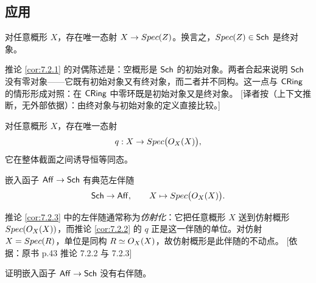 \subsection{应用}\label{sec:7.2}

\begin{corollary}\label{cor:7.2.1}
对任意概形 $X$，存在唯一态射 $X\to Spec(Z)$。换言之，$Spec(Z)\in\mathsf{Sch}$ 是终对象。
\end{corollary}

\begin{yizhu}
推论 \ref{cor:7.2.1} 的对偶陈述是：空概形是 $\mathsf{Sch}$ 的初始对象。两者合起来说明 $\mathsf{Sch}$ 没有零对象——它既有初始对象又有终对象，而二者并不同构。这一点与 $\mathsf{CRing}$ 的情形形成对照：在 $\mathsf{CRing}$ 中零环既是初始对象又是终对象。
[译者按（上下文推断，无外部依据）：由终对象与初始对象的定义直接比较。]
\end{yizhu}

\begin{corollary}\label{cor:7.2.2}
对任意概形 $X$，存在唯一态射
\[
q:X\to Spec\bigl(O_X(X)\bigr),
\]
它在整体截面之间诱导恒等同态。
\end{corollary}

\begin{corollary}\label{cor:7.2.3}
嵌入函子 $\mathsf{Aff}\to\mathsf{Sch}$ 有典范左伴随
\[
\mathsf{Sch}\to\mathsf{Aff},\qquad X\mapsto Spec\bigl(O_X(X)\bigr).
\]
\end{corollary}

\begin{yizhu}
推论 \ref{cor:7.2.3} 中的左伴随通常称为\emph{仿射化}：它把任意概形 $X$ 送到仿射概形 $Spec(O_X(X))$，而推论 \ref{cor:7.2.2} 的 $q$ 正是这一伴随的单位。对仿射 $X=Spec(R)$，单位是同构 $R\simeq O_X(X)$，故仿射概形是此伴随的不动点。
[依据：原书 p.43 推论 7.2.2 与 7.2.3]
\end{yizhu}

\begin{exercise}\label{exc:7.2.4}
证明嵌入函子 $\mathsf{Aff}\to\mathsf{Sch}$ 没有右伴随。
\end{exercise}

